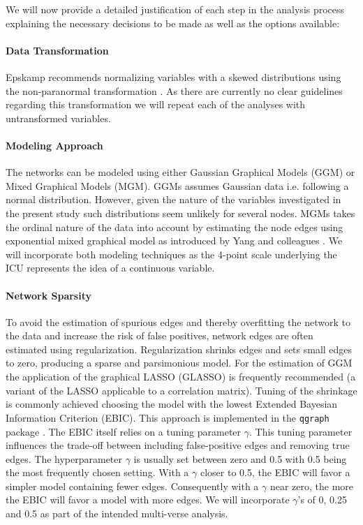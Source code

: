 \documentclass[a4paper,12pt]{article} %
\begin{document}
		We will now  provide a detailed justification of each step in the analysis process explaining the necessary decisions to be made as well as the options available:

		\paragraph{Data Transformation}
		Epskamp \parencite*{epskamp_estimating_2018} recommends normalizing variables with a skewed distributions using the non-paranormal transformation \parencite{liu_nonparanormal_2009}.
		As there are currently no clear guidelines regarding this transformation we will repeat each of the analyses with untransformed variables. %

\paragraph{Modeling Approach}
		The networks can be modeled using either Gaussian Graphical Models (GGM) or Mixed Graphical Models (MGM).
		GGMs assumes Gaussian data i.e. following a normal distribution.
		However, given the nature of the variables investigated in the present study such distributions seem unlikely for several nodes.
		MGMs takes the ordinal nature of the data into account by estimating the node edges using exponential mixed graphical model as introduced by Yang and colleagues \parencite*{yang_mixed_2014}. 
		We will incorporate both modeling techniques as the 4-point scale underlying the ICU represents the idea of a continuous variable.

		\paragraph{Network Sparsity} To avoid the estimation of spurious edges and thereby overfitting the network to the data and increase the risk of false positives, network edges are often estimated using regularization.
		Regularization shrinks edges and sets small edges to zero, producing a sparse and parsimonious model.
		For the estimation of GGM the application of the graphical LASSO (GLASSO) is frequently recommended (a variant of the LASSO applicable to a correlation matrix).
		Tuning of the shrinkage is commonly achieved choosing the model with the lowest Extended Bayesian Information Criterion (EBIC).
		This approach is implemented in the \texttt{qgraph} package \parencite{epskamp_qgraph_2012}.
		The EBIC itself relies on a tuning parameter $\gamma$.
		This tuning parameter influences the trade-off between including false-positive edges and removing true edges.
		The hyperparameter $\gamma$ is usually set between zero and 0.5 \parencite{epskamp_tutorial_2018} with 0.5 being the most frequently chosen setting.
		With a $\gamma$ closer to 0.5, the EBIC will favor a simpler model containing fewer edges.
		Consequently with a $\gamma$ near zero, the more the EBIC will favor a model with more edges.
		We will incorporate $\gamma$'s of 0, 0.25 and 0.5 as part of the intended multi-verse analysis.
\end{document}
